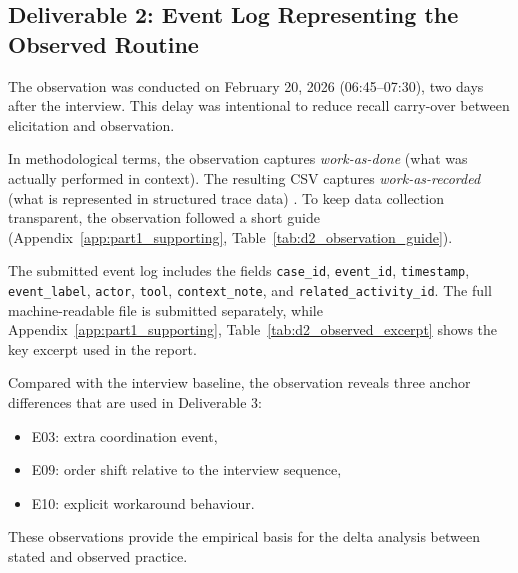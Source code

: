 \subsection{Deliverable 2: Event Log Representing the Observed Routine}
\label{sec:deliverable2}

The observation was conducted on February 20, 2026 (06:45--07:30), two days after the interview. This delay was intentional to reduce recall carry-over between elicitation and observation.

In methodological terms, the observation captures \textit{work-as-done} (what was actually performed in context). The resulting CSV captures \textit{work-as-recorded} (what is represented in structured trace data) . To keep data collection transparent, the observation followed a short guide (Appendix~\ref{app:part1_supporting}, Table~\ref{tab:d2_observation_guide}).

The submitted event log includes the fields \texttt{case\_id}, \texttt{event\_id}, \texttt{timestamp}, \texttt{event\_label}, \texttt{actor}, \texttt{tool}, \texttt{context\_note}, and \texttt{related\_activity\_id}. The full machine-readable file is submitted separately, while Appendix~\ref{app:part1_supporting}, Table~\ref{tab:d2_observed_excerpt} shows the key excerpt used in the report.

Compared with the interview baseline, the observation reveals three anchor differences that are used in Deliverable 3:
\begin{itemize}
  \item E03: extra coordination event,
  \item E09: order shift relative to the interview sequence,
  \item E10: explicit workaround behaviour.
\end{itemize}

These observations provide the empirical basis for the delta analysis between stated and observed practice.
